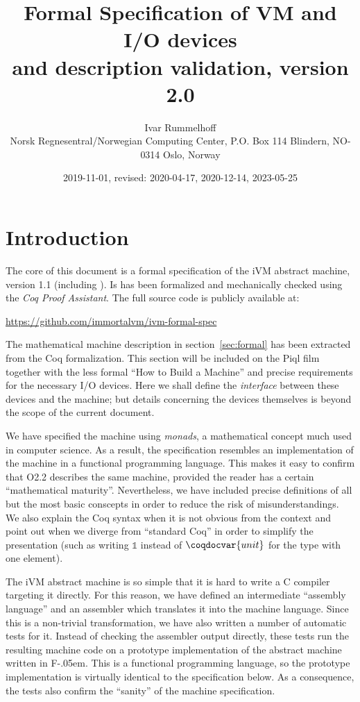 \documentclass[10pt,a4paper]{article}
\title{%
  Formal Specification of VM and I/O devices\\
  and description validation, version 2.0
}
\author{Ivar Rummelhoff\\
\small Norsk Regnesentral/Norwegian Computing Center, P.O. Box 114 Blindern, NO-0314 Oslo, Norway }
\date{2019-11-01, revised: 2020-04-17, 2020-12-14, 2023-05-25}
\newcommand{\mathbbm}{\mathds}
\newcommand{\FSharp}{\textsf{F\nolinebreak[4]\kern-.05em\raisebox{.2ex}{\small\#}}\xspace}
\begin{document}
\maketitle

\section{Introduction}

The core of this document is a formal specification of the iVM abstract machine, version 1.1 (including ).
Is has been formalized and mechanically checked using the \emph{Coq Proof Assistant}.
The full source code is publicly available at:

\begin{center}
  \url{https://github.com/immortalvm/ivm-formal-spec}
\end{center}

The mathematical machine description in section~\ref{sec:formal} has been extracted from the Coq formalization.
This section will be included on the Piql film together with the less formal ``How to Build a Machine'' and precise requirements for the necessary I/O devices.
Here we shall define the \emph{interface} between these devices and the machine; but details concerning the devices themselves is beyond the scope of the current document.

We have specified the machine using \emph{monads}, a mathematical concept much used in computer science.
As a result, the specification resembles an implementation of the machine in a functional programming language.
This makes it easy to confirm that O2.2 describes the same machine, provided the reader has a certain ``mathematical maturity''.
Nevertheless, we have included precise definitions of all but the most basic conscepts in order to reduce the risk of misunderstandings.
We also explain the Coq syntax when it is not obvious from the context and point out when we diverge from ``standard Coq'' in order to simplify the presentation
(such as writing $\mathbbm{1}$ instead of $\coqdocvar{unit}$ for the type with one element).

The iVM abstract machine is so simple that it is hard to write a C compiler targeting it directly.
For this reason, we have defined an intermediate ``assembly language'' and an assembler which translates it into the machine language.
Since this is a non-trivial transformation, we have also written a number of automatic tests for it.
Instead of checking the assembler output directly, these tests run the resulting machine code on a prototype implementation of the abstract machine written in \FSharp.
This is a functional programming language, so the prototype implementation is virtually identical to the specification below.
As a consequence, the tests also confirm the ``sanity'' of the machine specification.
\end{document}
